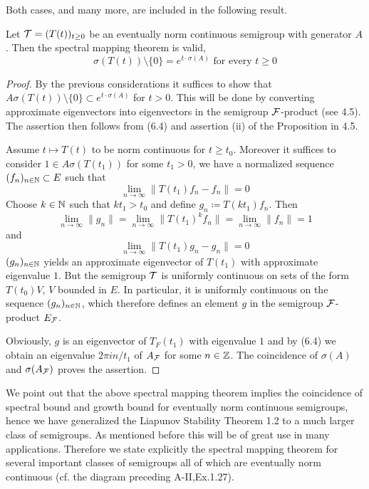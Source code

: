 Both cases, and many more, are included in the following result.
\begin{theorem}\label{thm:a3-6.6}
Let $\mathcal{T} = (T(t))_{t\geq 0}$ be an eventually norm continuous semigroup with generator $A$.
Then the spectral mapping theorem is valid, \ie
\[
\sigma(T(t)) \setminus \{0\} = e^{t \cdot \sigma(A)} \text{ for every } t \geq 0
\]
\end{theorem}
\begin{proof}
By the previous considerations it suffices to show that $A\sigma(T(t)) \setminus \{0\} \subset e^{t \cdot \sigma(A)}$ for $t > 0$.
This will be done by converting approximate eigenvectors into eigenvectors in the semigroup $\mathcal{F}$-product (see 4.5).
The assertion then follows from (6.4) and assertion (ii) of the Proposition in 4.5.

Assume $t \mapsto T(t)$ to be norm continuous for $t \geq t_{0}$.
Moreover it suffices to consider $1 \in A\sigma(T(t_{1}))$ for some $t_{1} > 0$, \ie we have a normalized sequence $(f_{n})_{n\in\mathbb{N}} \subset E$ such that
\[
\lim_{n\to\infty} \|T(t_{1})f_{n} - f_{n}\| = 0
\]
Choose $k \in \mathbb{N}$ such that $kt_{1} > t_{0}$ and define $g_{n} \coloneqq T(kt_{1})f_{n}$.
Then
\[
\lim_{n\to\infty}\|g_{n}\| = \lim_{n\to\infty}\|T(t_{1})^{k}f_{n}\| = \lim_{n\to\infty}\|f_{n}\| = 1
\]
and
\[
\lim_{n\to\infty} \|T(t_{1})g_{n} - g_{n}\| = 0
\]
\ie $(g_{n})_{n\in\mathbb{N}}$ yields an approximate eigenvector of $T(t_{1})$ with approximate eigenvalue $1$.
But the semigroup $\mathcal{T}$ is uniformly continuous on sets of the form $T(t_{0})V$, $V$ bounded in $E$.
In particular, it is uniformly continuous on the sequence $(g_{n})_{n\in\mathbb{N}}$, which therefore defines an element $g$ in the semigroup $\mathcal{F}$-product $E_{\mathcal{F}}$.

Obviously, $g$ is an eigenvector of $T_{F}(t_{1})$ with eigenvalue $1$ and by (6.4) we obtain an eigenvalue $2\pi i n/t_{1}$ of $A_{\mathcal{F}}$ for some $n \in \mathbb{Z}$.
The coincidence of $\sigma(A)$ and $\sigma(A_{\mathcal{F}})$ proves the assertion.
\end{proof}
We point out that the above spectral mapping theorem implies the coincidence of spectral bound and growth bound for eventually norm continuous semigroups, hence we have generalized the Liapunov Stability Theorem 1.2 to a much larger class of semigroups.
As mentioned before this will be of great use in many applications.
Therefore we state explicitly the spectral mapping theorem for several important classes of semigroups all of which are eventually norm continuous (cf. the diagram preceding A-II,Ex.1.27).
